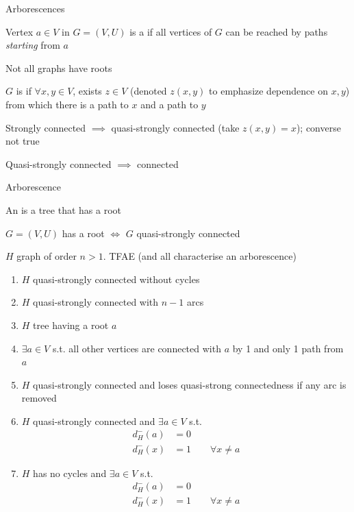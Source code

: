 \documentclass[aspectratio=169]{beamer}\usepackage[]{graphicx}\usepackage[]{xcolor}
\begin{document}
\begin{frame}{Arborescences}
\begin{definition}[Root]
Vertex $a\in V$ in $G=(V,U)$ is a  if all vertices of $G$ can be reached by paths \emph{starting} from $a$
\end{definition}
Not all graphs have roots
\vfill
\begin{definition}
$G$ is  if $\forall x,y\in V$, exists $z\in V$ (denoted $z(x,y)$ to emphasize dependence on $x,y$) from which there is a path to $x$ and a path to $y$
\end{definition}
Strongly connected $\implies$ quasi-strongly connected (take $z(x,y)=x$); converse not true

Quasi-strongly connected $\implies$ connected
\end{frame}

\begin{frame}{Arborescence}
\begin{definition}[Arborescence]
An  is a tree that has a root
\end{definition}
\vfill
\begin{lemma}
$G=(V,U)$ has a root $\iff$ $G$ quasi-strongly connected
\end{lemma}
\end{frame}

\begin{frame}
\begin{theorem}
$H$ graph of order $n>1$. TFAE (and all characterise an arborescence)
\begin{enumerate}
\item $H$ quasi-strongly connected without cycles
\item $H$ quasi-strongly connected with $n-1$ arcs
\item $H$ tree having a root $a$
\item $\exists a\in V$ s.t. all other vertices are connected with $a$ by 1 and only 1 path from $a$
\item $H$ quasi-strongly connected and loses quasi-strong connectedness if any arc is removed
\item $H$ quasi-strongly connected and $\exists a\in V$ s.t.
\begin{align*}
d_H^-(a)&=0 \\
d_H^-(x)&=1\qquad \forall x\neq a
\end{align*}
\item $H$ has no cycles and $\exists a\in V$ s.t.
\begin{align*}
d_H^-(a)&=0 \\
d_H^-(x)&=1\qquad \forall x\neq a
\end{align*}
\end{enumerate}
\end{theorem}
\end{frame}
\end{document}
